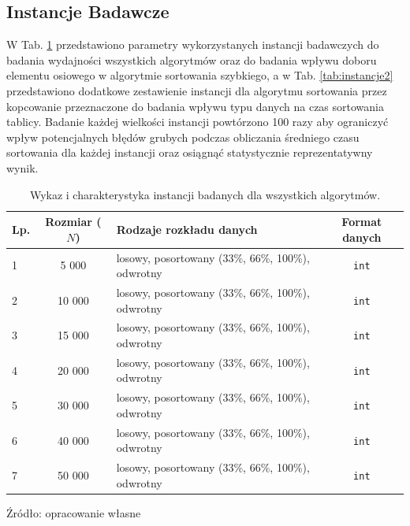 \documentclass{article}
\begin{document}
    \subsection{Instancje Badawcze}
    W Tab. \ref{tab:instancje} przedstawiono parametry wykorzystanych instancji badawczych do badania wydajności wszystkich
    algorytmów oraz do badania wpływu doboru elementu osiowego w algorytmie sortowania szybkiego, a w Tab. \ref{tab:instancje2} przedstawiono dodatkowe zestawienie instancji dla algorytmu
    sortowania przez kopcowanie przeznaczone do badania wpływu typu danych na czas sortowania tablicy.
    Badanie każdej wielkości instancji powtórzono 100 razy aby ograniczyć wpływ potencjalnych
    błędów grubych podczas obliczania średniego czasu sortowania dla każdej instancji oraz osiągnąć statystycznie reprezentatywny wynik.
    \vspace{2 pt}
    \clearpage
    \begin{table}[h]
    \centering
    \caption{Wykaz i charakterystyka instancji badanych dla wszystkich algorytmów.}
    \label{tab:instancje}
    \begin{tabular}{|l|c|p{7cm}|c|}
      \hline
    \textbf{Lp.} & \textbf{Rozmiar ($N$)} & \textbf{Rodzaje rozkładu danych} & \textbf{Format danych} \\ \hline
    1 & 5 000  & losowy, posortowany (33\%, 66\%, 100\%), odwrotny & \texttt{int} \\ \hline
    2 & 10 000 & losowy, posortowany (33\%, 66\%, 100\%), odwrotny & \texttt{int} \\ \hline
    3 & 15 000 & losowy, posortowany (33\%, 66\%, 100\%), odwrotny & \texttt{int} \\ \hline
    4 & 20 000 & losowy, posortowany (33\%, 66\%, 100\%), odwrotny & \texttt{int} \\ \hline
    5 & 30 000 & losowy, posortowany (33\%, 66\%, 100\%), odwrotny & \texttt{int} \\ \hline
    6 & 40 000 & losowy, posortowany (33\%, 66\%, 100\%), odwrotny & \texttt{int} \\ \hline
    7 & 50 000 & losowy, posortowany (33\%, 66\%, 100\%), odwrotny & \texttt{int} \\ \hline
    \end{tabular}
    \small Źródło: opracowanie własne
  \end{table}
  \vspace{2 pt}
\end{document}
